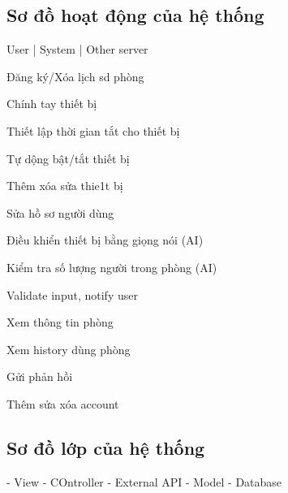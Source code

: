 \subsection{Sơ đồ hoạt động của hệ thống}
User | System | Other server

Đăng ký/Xóa lịch sd phòng

Chính tay thiết bị

Thiết lập thời gian tắt cho thiết bị

Tự dộng bật/tắt thiết bị

Thêm xóa sửa thie1t bị

Sửa hồ sơ người dùng

Điều khiển thiết bị bằng giọng nói (AI)

Kiểm tra số lượng người trong phòng (AI)

Validate input, notify user

Xem thông tin phòng

Xem history dùng phòng

Gửi phản hồi

Thêm sửa xóa account
\subsection{Sơ đồ lớp của hệ thống}
- View
- COntroller
- External API
- Model
- Database